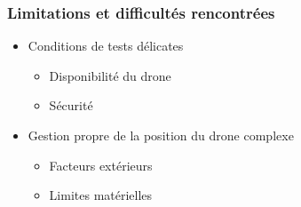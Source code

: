 \begin{frame}
\frametitle{Limitations et difficultés rencontrées}
\begin{center}
\begin{itemize}
\item Conditions de tests délicates
\begin{itemize}
\item Disponibilité du drone
\item Sécurité
\end{itemize}
\item Gestion propre de la position du drone complexe
\begin{itemize}
\item Facteurs extérieurs
\item Limites matérielles
\end{itemize}
\end{itemize}
\end{center}
\end{frame}